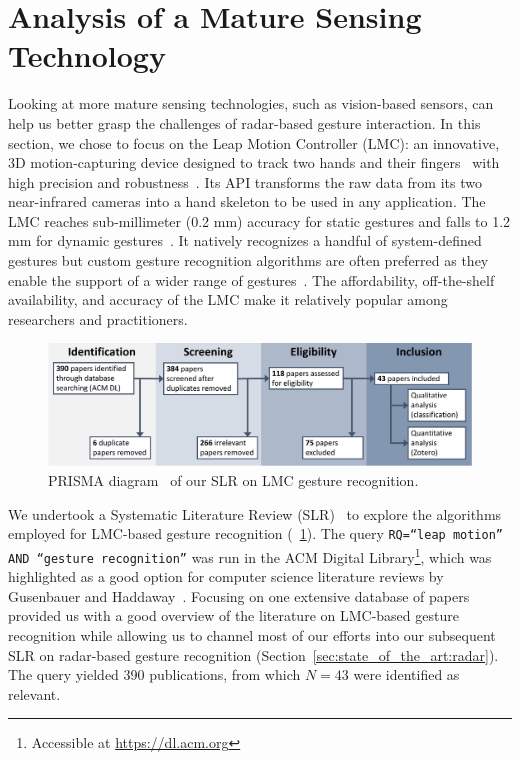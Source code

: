 \section{Analysis of a Mature Sensing Technology} \label{sec:state_of_the_art:lmc}
Looking at more mature sensing technologies, such as vision-based sensors, can help us better grasp the challenges of radar-based gesture interaction.
%
In this section, we chose to focus on the Leap Motion Controller (LMC): an innovative, 3D motion-capturing device designed to track two hands and their fingers~\cite{Togootogtokh:2018} with high precision and robustness~\cite{Weichert:2013}. Its API transforms the raw data from its two near-infrared cameras into a hand skeleton to be used in any application. The LMC reaches sub-millimeter (0.2 mm) accuracy for static gestures and falls to 1.2 mm for dynamic gestures~\cite{Weichert:2013}. It natively recognizes a handful of system-defined gestures but custom gesture recognition algorithms are often preferred as they enable the support of a wider range of gestures~\cite{Brandon:2014}.
The affordability, off-the-shelf availability, and accuracy of the LMC make it relatively popular among researchers and practitioners.

\begin{figure}[h]
    \centering
    \includegraphics[width=\linewidth]{Figures/StateOfTheArt/LMC/PRISMA-LMC.pdf}
    \vspace{-18pt}
    \captionsetup{width=.9\linewidth}
    \caption{PRISMA diagram~\cite{Page:2021} of our SLR on LMC gesture recognition.}
    \label{fig:state_of_the_art:lmc:prisma}
\end{figure}

We undertook a Systematic Literature Review (SLR)~\cite{Kitchenham:2010} to explore the algorithms employed for LMC-based gesture recognition (\fig~\ref{fig:state_of_the_art:lmc:prisma}). 
%
The query \texttt{RQ=``leap motion'' AND ``gesture recognition''} was run in the ACM Digital Library\footnote{Accessible at \url{https://dl.acm.org}}, which was highlighted as a good option for computer science literature reviews by Gusenbauer and Haddaway~\cite{Gusenbauer:2020}. Focusing on one extensive database of papers provided us with a good overview of the literature on LMC-based gesture recognition while allowing us to channel most of our efforts into our subsequent SLR on radar-based gesture recognition (Section~\ref{sec:state_of_the_art:radar}).
%
The query yielded 390 publications, from which $N{=}43$ were identified as relevant. 

